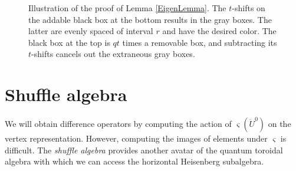 \documentclass{amsart}
\newcommand{\qqq}{\mathfrak{q}}
\newcommand{\ddd}{\mathfrak{d}}
\newtheorem{prop}[thm]{Proposition}
\theoremstyle{remark}
\numberwithin{thm}{section}
\numberwithin{equation}{section}
\begin{document}
\begin{figure}
    \centering
    \caption{Illustration of the proof of Lemma \ref{EigenLemma}.
    The $t$-shifts on the addable black box at the bottom results in the gray boxes.
    The latter are evenly spaced of interval $r$ and have the desired color.
    The black box at the top is $qt$ times a removable box, and subtracting its $t$-shifts cancels out the extraneous gray boxes.}
    \label{fig:EigenLem}
\end{figure}
%

\section{Shuffle algebra}\label{Shuffle}
We will obtain difference operators by computing the action of $\varsigma(\ddot{U}^0)$ on the vertex representation.
However, computing the images of elements under $\varsigma$ is difficult.
The \textit{shuffle algebra} provides another avatar of the quantum toroidal algebra with which we can access the horizontal Heisenberg subalgebra.
\end{document}
